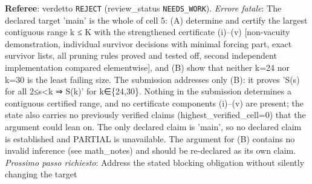 \documentclass[11pt,a4paper]{article}
\begin{document}
\begin{description}
\textbf{Referee}: verdetto \texttt{REJECT} (review\_status \texttt{NEEDS\_WORK}).
\emph{Errore fatale}: The declared target 'main' is the whole of cell 5: (A) determine and certify the largest contiguous range k ≤ K with the strengthened certificate (i)–(v) [non-vacuity demonstration, individual survivor decisions with minimal forcing part, exact survivor lists, all pruning rules proved and tested off, second independent implementation compared elementwise], and (B) show that neither k=24 nor k=30 is the least failing size. The submission addresses only (B): it proves 'S(s) for all 2≤s\textless{}k ⇒ S(k)' for k∈\{24,30\}. Nothing in the submission determines a contiguous certified range, and no certificate components (i)–(v) are present; the state also carries no previously verified claims (highest\_verified\_cell=0) that the argument could lean on. The only declared claim is 'main', so no declared claim is established and PARTIAL is unavailable. The argument for (B) contains no invalid inference (see math\_notes) and should be re-declared as its own claim.
\emph{Prossimo passo richiesto}: Address the stated blocking obligation without silently changing the target
\end{description}
\end{document}
